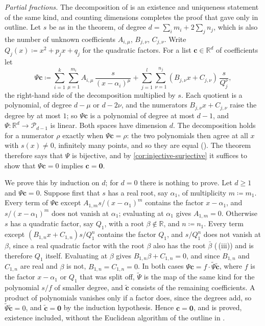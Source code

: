 \emph{Partial fractions.} The decomposition of  is an existence and uniqueness statement of the same kind, and counting dimensions completes the proof that  gave only in outline. Let $s$ be as in the theorem, of degree $d=\sum_im_i+2\sum_jn_j$, which is also the number of unknown coefficients $A_{i,\mu}$, $B_{j,\nu}$, $C_{j,\nu}$. Write $Q_j(x)\coloneqq x^2+p_jx+q_j$ for the quadratic factors. For a list $\mathbf c\in\mathbb R^d$ of coefficients let
\[
\Psi\mathbf c\coloneqq\sum_{i=1}^k\sum_{\mu=1}^{m_i}A_{i,\mu}\,\frac{s}{(x-\alpha_i)^\mu}+\sum_{j=1}^l\sum_{\nu=1}^{n_j}(B_{j,\nu}x+C_{j,\nu})\,\frac{s}{Q_j^\nu},
\]
the right-hand side of the decomposition multiplied by $s$. Each quotient is a polynomial, of degree $d-\mu$ or $d-2\nu$, and the numerators $B_{j,\nu}x+C_{j,\nu}$ raise the degree by at most $1$; so $\Psi\mathbf c$ is a polynomial of degree at most $d-1$, and $\Psi\colon\mathbb R^d\to\mathcal P_{d-1}$ is linear. Both spaces have dimension $d$. The decomposition holds for a numerator $\rho$ exactly when $\Psi\mathbf c=\rho$: the two polynomials then agree at all $x$ with $s(x)\ne0$, infinitely many points, and so they are equal (). The theorem therefore says that $\Psi$ is bijective, and by \cref{cor:injective-surjective} it suffices to show that $\Psi\mathbf c=0$ implies $\mathbf c=\mathbf 0$.

We prove this by induction on $d$; for $d=0$ there is nothing to prove. Let $d\ge1$ and $\Psi\mathbf c=0$. Suppose first that $s$ has a real root, say $\alpha_1$, of multiplicity $m\coloneqq m_1$. Every term of $\Psi\mathbf c$ except $A_{1,m}s/(x-\alpha_1)^m$ contains the factor $x-\alpha_1$, and $s/(x-\alpha_1)^m$ does not vanish at $\alpha_1$; evaluating at $\alpha_1$ gives $A_{1,m}=0$. Otherwise $s$ has a quadratic factor, say $Q_1$, with a root $\beta\notin\mathbb R$, and $n\coloneqq n_1$. Every term except $(B_{1,n}x+C_{1,n})s/Q_1^n$ contains the factor $Q_1$, and $s/Q_1^n$ does not vanish at $\beta$, since a real quadratic factor with the root $\beta$ also has the root $\bar\beta$ (\,(iii)) and is therefore $Q_1$ itself. Evaluating at $\beta$ gives $B_{1,n}\beta+C_{1,n}=0$, and since $B_{1,n}$ and $C_{1,n}$ are real and $\beta$ is not, $B_{1,n}=C_{1,n}=0$. In both cases $\Psi\mathbf c=f\cdot\tilde\Psi\tilde{\mathbf c}$, where $f$ is the factor $x-\alpha_1$ or $Q_1$ that was split off, $\tilde\Psi$ is the map of the same kind for the polynomial $s/f$ of smaller degree, and $\tilde{\mathbf c}$ consists of the remaining coefficients. A product of polynomials vanishes only if a factor does, since the degrees add, so $\tilde\Psi\tilde{\mathbf c}=0$, and $\tilde{\mathbf c}=\mathbf 0$ by the induction hypothesis. Hence $\mathbf c=\mathbf 0$, and  is proved, existence included, without the Euclidean algorithm of the outline in .

